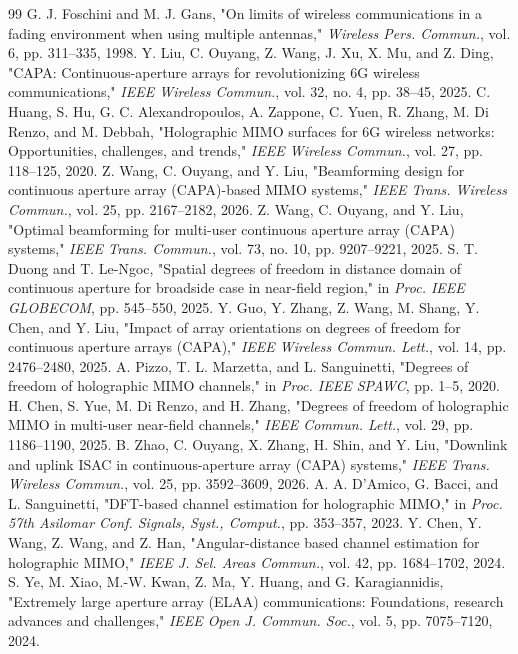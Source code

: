 \documentclass[journal]{IEEEtran}
\begin{document}
\begin{thebibliography}{99}
G. J. Foschini and M. J. Gans, "On limits of wireless communications in a fading environment when using multiple antennas," \emph{Wireless Pers. Commun.}, vol. 6, pp. 311--335, 1998.
Y. Liu, C. Ouyang, Z. Wang, J. Xu, X. Mu, and Z. Ding, "CAPA: Continuous-aperture arrays for revolutionizing 6G wireless communications," \emph{IEEE Wireless Commun.}, vol. 32, no. 4, pp. 38--45, 2025.
C. Huang, S. Hu, G. C. Alexandropoulos, A. Zappone, C. Yuen, R. Zhang, M. Di Renzo, and M. Debbah, "Holographic MIMO surfaces for 6G wireless networks: Opportunities, challenges, and trends," \emph{IEEE Wireless Commun.}, vol. 27, pp. 118--125, 2020.
Z. Wang, C. Ouyang, and Y. Liu, "Beamforming design for continuous aperture array (CAPA)-based MIMO systems," \emph{IEEE Trans. Wireless Commun.}, vol. 25, pp. 2167--2182, 2026.
Z. Wang, C. Ouyang, and Y. Liu, "Optimal beamforming for multi-user continuous aperture array (CAPA) systems," \emph{IEEE Trans. Commun.}, vol. 73, no. 10, pp. 9207--9221, 2025.
S. T. Duong and T. Le-Ngoc, "Spatial degrees of freedom in distance domain of continuous aperture for broadside case in near-field region," in \emph{Proc. IEEE GLOBECOM}, pp. 545--550, 2025.
Y. Guo, Y. Zhang, Z. Wang, M. Shang, Y. Chen, and Y. Liu, "Impact of array orientations on degrees of freedom for continuous aperture arrays (CAPA)," \emph{IEEE Wireless Commun. Lett.}, vol. 14, pp. 2476--2480, 2025.
A. Pizzo, T. L. Marzetta, and L. Sanguinetti, "Degrees of freedom of holographic MIMO channels," in \emph{Proc. IEEE SPAWC}, pp. 1--5, 2020.
H. Chen, S. Yue, M. Di Renzo, and H. Zhang, "Degrees of freedom of holographic MIMO in multi-user near-field channels," \emph{IEEE Commun. Lett.}, vol. 29, pp. 1186--1190, 2025.
B. Zhao, C. Ouyang, X. Zhang, H. Shin, and Y. Liu, "Downlink and uplink ISAC in continuous-aperture array (CAPA) systems," \emph{IEEE Trans. Wireless Commun.}, vol. 25, pp. 3592--3609, 2026.
A. A. D'Amico, G. Bacci, and L. Sanguinetti, "DFT-based channel estimation for holographic MIMO," in \emph{Proc. 57th Asilomar Conf. Signals, Syst., Comput.}, pp. 353--357, 2023.
Y. Chen, Y. Wang, Z. Wang, and Z. Han, "Angular-distance based channel estimation for holographic MIMO," \emph{IEEE J. Sel. Areas Commun.}, vol. 42, pp. 1684--1702, 2024.
S. Ye, M. Xiao, M.-W. Kwan, Z. Ma, Y. Huang, and G. Karagiannidis, "Extremely large aperture array (ELAA) communications: Foundations, research advances and challenges," \emph{IEEE Open J. Commun. Soc.}, vol. 5, pp. 7075--7120, 2024.

\end{thebibliography}
\end{document}
